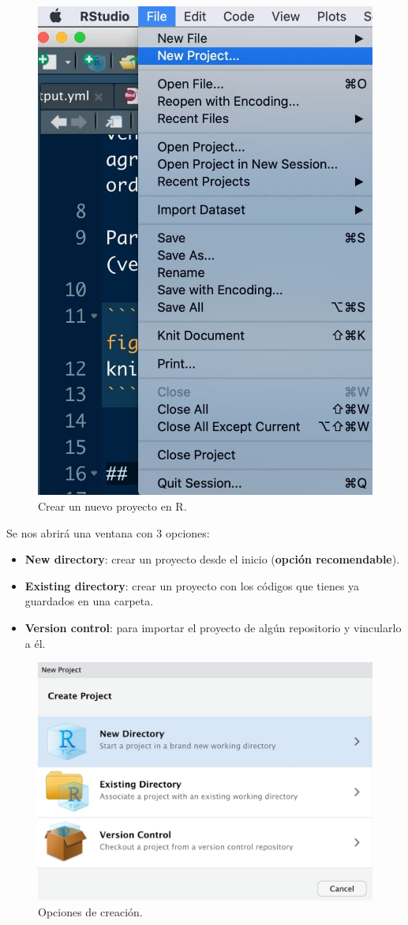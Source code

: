 \documentclass[11pt,]{book}
\begin{document}
\begin{figure}

{\centering \includegraphics[width=0.5\linewidth]{./img/crear_proyecto1} 

}

\caption{Crear un nuevo proyecto en R.}\label{fig:crear-proyecto1}
\end{figure}

Se nos abrirá una ventana con 3 opciones:

\begin{itemize}
\item
  \textbf{New directory}: crear un proyecto desde el inicio (\textbf{opción recomendable}).
\item
  \textbf{Existing directory}: crear un proyecto con los códigos que tienes ya guardados en una carpeta.
\item
  \textbf{Version control}: para importar el proyecto de algún repositorio y vincularlo a él.
\end{itemize}

\begin{figure}

{\centering \includegraphics[width=0.5\linewidth]{./img/crear_proyecto2} 

}

\caption{Opciones de creación.}\label{fig:crear-proyecto2}
\end{figure}
\end{document}
